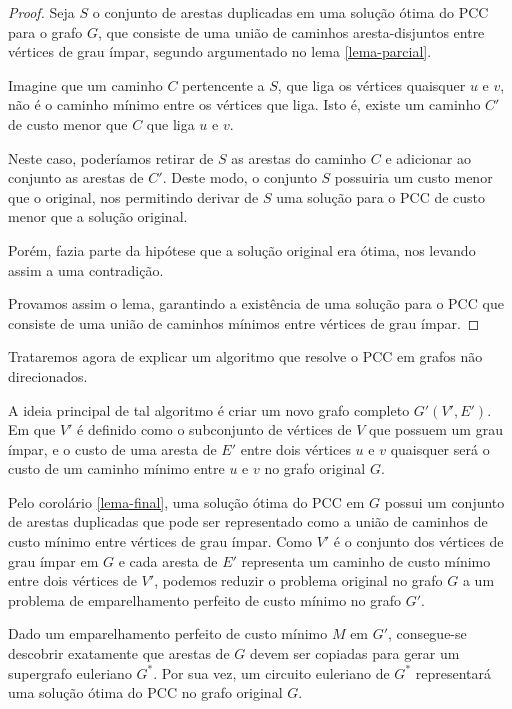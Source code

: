 \begin{proof}
    Seja $S$ o conjunto de arestas duplicadas em uma solução ótima do PCC para o grafo $G$, que consiste de uma união de caminhos aresta-disjuntos entre vértices de grau ímpar, segundo argumentado no lema \ref{lema-parcial}.

    Imagine que um caminho $C$ pertencente a $S$, que liga os vértices quaisquer $u$ e $v$, não é o caminho mínimo entre os vértices que liga. 
    Isto é, existe um caminho $C'$ de custo menor que $C$ que liga $u$ e $v$.

    Neste caso, poderíamos retirar de $S$ as arestas do caminho $C$ e adicionar ao conjunto as arestas de $C'$. Deste modo, o conjunto $S$ possuiria um custo menor que o original, nos permitindo derivar de $S$ uma solução para o PCC de custo menor que a solução original.

    Porém, fazia parte da hipótese que a solução original era ótima, nos levando assim a uma contradição.

    Provamos assim o lema, garantindo a existência de uma solução para o PCC que consiste de uma união de caminhos mínimos entre vértices de grau ímpar.

\end{proof}

Trataremos agora de explicar um algoritmo que resolve o PCC em grafos não direcionados.

A ideia principal de tal algoritmo é criar um novo grafo completo $G'(V', E')$. 
Em que $V'$ é definido como o subconjunto de vértices de $V$ que possuem um grau ímpar, e o custo de uma aresta de $E'$ entre dois vértices $u$ e $v$ quaisquer será o custo de um caminho mínimo entre $u$ e $v$ no grafo original $G$.

Pelo corolário \ref{lema-final}, uma solução ótima do PCC em $G$ possui um conjunto de arestas duplicadas que pode ser representado como a união de caminhos de custo mínimo entre vértices de grau ímpar. 
Como $V'$ é o conjunto dos vértices de grau ímpar em $G$ e cada aresta de $E'$ representa um caminho de custo mínimo entre dois vértices de $V'$, podemos reduzir o problema original no grafo $G$ a um problema de emparelhamento perfeito de custo mínimo no grafo $G'$.

Dado um emparelhamento perfeito de custo mínimo $M$ em $G'$, consegue-se descobrir exatamente que arestas de $G$ devem ser copiadas para gerar um supergrafo euleriano $G^*$.
Por sua vez, um circuito euleriano de $G^*$ representará uma solução ótima do PCC no grafo original $G$.

